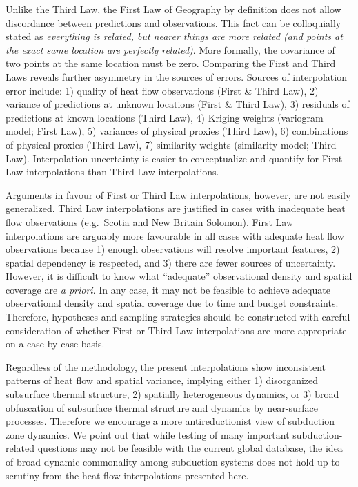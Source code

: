 \documentclass[draft,linenumbers]{agujournal2018}
\begin{document}
Unlike the Third Law, the First Law of Geography by definition does not
allow discordance between predictions and observations. This fact can be
colloquially stated as \emph{everything is related, but nearer things
are more related (and points at the exact same location are perfectly
related)}. More formally, the covariance of two points at the same
location must be zero. Comparing the First and Third Laws reveals
further asymmetry in the sources of errors. Sources of interpolation
error include: 1) quality of heat flow observations (First \& Third
Law), 2) variance of predictions at unknown locations (First \& Third
Law), 3) residuals of predictions at known locations (Third Law), 4)
Kriging weights (variogram model; First Law), 5) variances of physical
proxies (Third Law), 6) combinations of physical proxies (Third Law), 7)
similarity weights (similarity model; Third Law). Interpolation
uncertainty is easier to conceptualize and quantify for First Law
interpolations than Third Law interpolations.

Arguments in favour of First or Third Law interpolations, however, are
not easily generalized. Third Law interpolations are justified in cases
with inadequate heat flow observations (e.g.~Scotia and New Britain
Solomon). First Law interpolations are arguably more favourable in all
cases with adequate heat flow observations because 1) enough
observations will resolve important features, 2) spatial dependency is
respected, and 3) there are fewer sources of uncertainty. However, it is
difficult to know what ``adequate'' observational density and spatial
coverage are \emph{a priori}. In any case, it may not be feasible to
achieve adequate observational density and spatial coverage due to time
and budget constraints. Therefore, hypotheses and sampling strategies
should be constructed with careful consideration of whether First or
Third Law interpolations are more appropriate on a case-by-case basis.

Regardless of the methodology, the present interpolations show
inconsistent patterns of heat flow and spatial variance, implying either
1) disorganized subsurface thermal structure, 2) spatially heterogeneous
dynamics, or 3) broad obfuscation of subsurface thermal structure and
dynamics by near-surface processes. Therefore we encourage a more
antireductionist view of subduction zone dynamics. We point out that
while testing of many important subduction-related questions may not be
feasible with the current global database, the idea of broad dynamic
commonality among subduction systems does not hold up to scrutiny from
the heat flow interpolations presented here.
\end{document}
